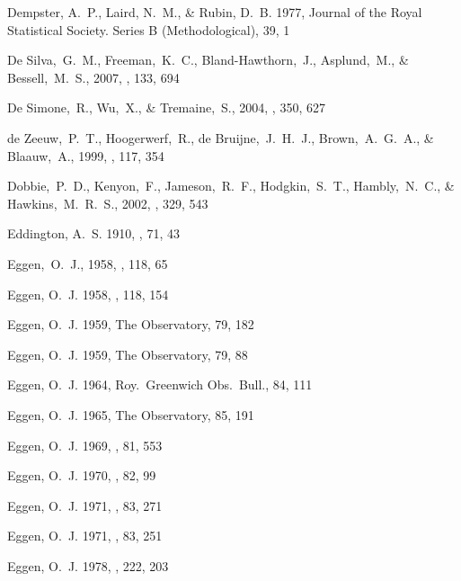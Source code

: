 \begin{thebibliography}{99}
{Dempster}, A.~P., {Laird}, N.~M., \& {Rubin}, D.~B. 1977, Journal of the Royal
  Statistical Society. Series B (Methodological), 39, 1

  De Silva,~G.~M., Freeman,~K.~C., Bland-Hawthorn,~J., Asplund,~M., \& Bessell,~M.~S., 2007,
  \aj, 133, 694

  De Simone,~R., Wu,~X., \& Tremaine,~S., 2004,
  \mnras, 350, 627

  de Zeeuw,~P.~T., Hoogerwerf,~R., de Bruijne,~J.~H.~J., Brown,~A.~G.~A., \& Blaauw,~A., 1999,
  \aj, 117, 354

  Dobbie,~P.~D., Kenyon,~F., Jameson,~R.~F., Hodgkin,~S.~T., Hambly,~N.~C., \& Hawkins,~M.~R.~S., 2002,
  \mnras, 329, 543

{Eddington}, A.~S. 1910, \mnras, 71, 43

  Eggen,~O.~J., 1958,
  \mnras, 118, 65

{Eggen}, O.~J. 1958, \mnras, 118, 154

{Eggen}, O.~J. 1959{}, The Observatory, 79, 182

{Eggen}, O.~J. 1959{}, The Observatory, 79, 88

{Eggen}, O.~J. 1964, Roy.~Greenwich Obs.~Bull., 84, 111

{Eggen}, O.~J. 1965, The Observatory, 85, 191

{Eggen}, O.~J. 1969, \pasp, 81, 553

{Eggen}, O.~J. 1970, \pasp, 82, 99

{Eggen}, O.~J. 1971{}, \pasp, 83, 271

{Eggen}, O.~J. 1971{}, \pasp, 83, 251

{Eggen}, O.~J. 1978, \apj, 222, 203


\end{thebibliography}
